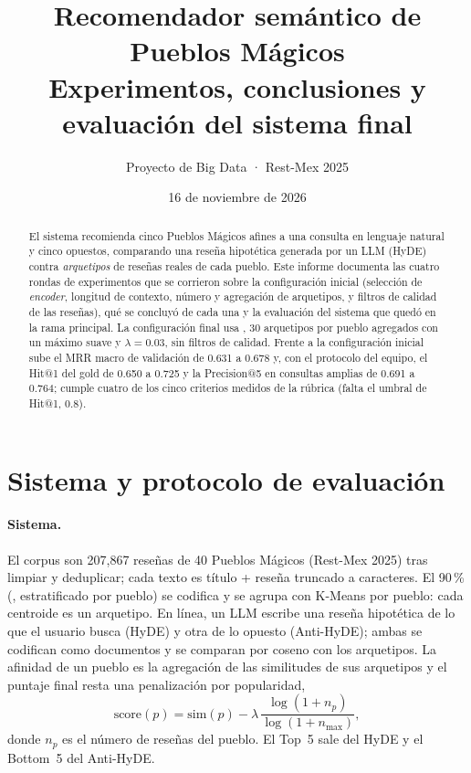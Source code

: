 \documentclass[11pt,a4paper]{article}
\title{Recomendador semántico de Pueblos Mágicos\\[2pt]\large Experimentos, conclusiones y evaluación del sistema final}
\author{Proyecto de Big Data · Rest-Mex 2025}
\date{16 de noviembre de 2026}
\newcommand{\cod}[1]{\texttt{\detokenize{#1}}}
\begin{document}
\maketitle

\begin{abstract}
\noindent El sistema recomienda cinco Pueblos Mágicos afines a una consulta en lenguaje natural y cinco
opuestos, comparando una reseña hipotética generada por un LLM (HyDE) contra \emph{arquetipos}
de reseñas reales de cada pueblo. Este informe documenta las cuatro rondas de experimentos que
se corrieron sobre la configuración inicial (selección de \emph{encoder}, longitud de contexto,
número y agregación de arquetipos, y filtros de calidad de las reseñas), qué se concluyó de
cada una y la evaluación del sistema que quedó en la rama principal.
La configuración final usa \cod{embeddinggemma}, 30 arquetipos por pueblo agregados con un
máximo suave y $\lambda=0.03$, sin filtros de calidad. Frente a la configuración inicial sube el
MRR macro de validación de 0.631 a 0.678 y, con el protocolo del equipo, el Hit@1 del gold de
0.650 a 0.725 y la Precision@5 en consultas amplias de 0.691 a 0.764; cumple cuatro de los cinco
criterios medidos de la rúbrica (falta el umbral de Hit@1, 0.8).
\end{abstract}

\section{Sistema y protocolo de evaluación}

\paragraph{Sistema.} El corpus son 207,867 reseñas de 40 Pueblos Mágicos (Rest-Mex 2025) tras
limpiar y deduplicar; cada texto es título + reseña truncado a \cod{max_chars} caracteres. El 90\,\%
(\cod{train}, estratificado por pueblo) se codifica y se agrupa con K-Means por pueblo: cada
centroide es un arquetipo. En línea, un LLM escribe una reseña hipotética de lo que el usuario
busca (HyDE) y otra de lo opuesto (Anti-HyDE); ambas se codifican como documentos y se comparan
por coseno con los arquetipos. La afinidad de un pueblo es la agregación de las similitudes de
sus arquetipos y el puntaje final resta una penalización por popularidad,
\[
  \text{score}(p) = \text{sim}(p) - \lambda\,\frac{\log(1+n_p)}{\log(1+n_{\max})},
\]
donde $n_p$ es el número de reseñas del pueblo. El Top~5 sale del HyDE y el Bottom~5 del Anti-HyDE.
\end{document}

